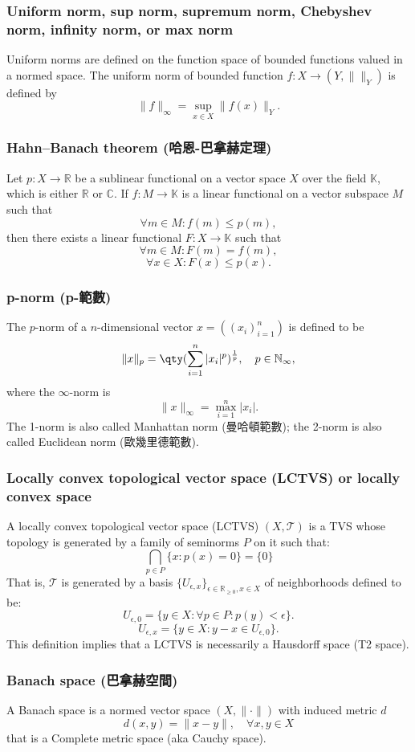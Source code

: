 \documentclass[a4paper,12pt]{report}
\begin{document}
\subsubsection{Uniform norm, sup norm, supremum norm, Chebyshev norm, infinity norm, or max norm}
Uniform norms are defined on the function space of bounded functions valued in a normed space. The uniform norm of bounded function $f\colon X\to(Y,\|\|_Y)$ is defined by
\[\|f\|_{\infty}=\sup_{x\in X}\|f(x)\|_Y.\]
\subsubsection{Hahn–Banach theorem (哈恩-巴拿赫定理)}
Let $p\colon X\to\mathbb{R}$ be a sublinear functional on a vector space $X$ over the field $\mathbb{K}$, which is either $\mathbb{R}$ or $\mathbb{C}$. If $f\colon M\to\mathbb{K}$ is a linear functional on a vector subspace $M$ such that
\[\forall m\in M\colon f(m)\leq p(m),\]
then there exists a linear functional $F\colon X\to\mathbb{K}$ such that
\[\forall m\in M\colon F(m)=f(m),\]
\[\forall x\in X\colon F(x)\leq p(x).\]
\subsubsection{p-norm (p-範數)}
The $p$-norm of a $n$-dimensional vector $x=((x_i)_{i=1}^n)$ is defined to be
\[\|x\|_p=\qty(\sum_{i=1}^n|x_i|^p)^{\frac{1}{p}},\quad p\in\mathbb{N}_{\infty},\]
where the $\infty$-norm is
\[\|x\|_{\infty}=\max_{i=1}^n|x_i|.\]
The 1-norm is also called Manhattan norm (曼哈頓範數); the 2-norm is also called Euclidean norm (歐幾里德範數).
\subsubsection{Locally convex topological vector space (LCTVS) or locally convex space}
A locally convex topological vector space (LCTVS) $(X,\mathcal{T})$ is a TVS whose topology is generated by a family of seminorms $P$ on it such that:
\[\bigcap_{p\in P}\{x\colon p(x)=0\}=\{0\}\]
That is, $\mathcal{T}$ is generated by a basis $\{U_{\epsilon,x}\}_{\epsilon\in\mathbb{R}_{\geq 0},x\in X}$ of neighborhoods defined to be:
\[U_{\epsilon,0}=\{y\in X\colon \forall p\in P\colon p(y)<\epsilon\}.\]
\[U_{\epsilon,x}=\{y\in X\colon y-x\in U_{\epsilon,0}\}.\]
This definition implies that a LCTVS is necessarily a Hausdorff space (T2 space).
\subsubsection{Banach space (巴拿赫空間)}
A Banach space is a normed vector space $(X,\|{\cdot }\|)$ with induced metric $d$
\[d(x,y)=\|x-y\|,\quad \forall x,y\in X\]
that is a Complete metric space (aka Cauchy space).
\end{document}
